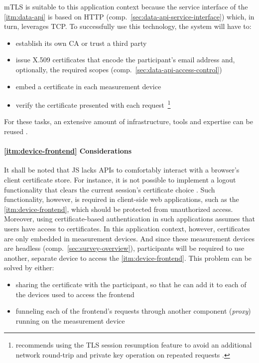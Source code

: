 \acs{mTLS} is suitable to this application context because the service interface of the \ref{itm:data-api} is based on \acs{HTTP} (comp.~\autoref{sec:data-api-service-interface}) which, in turn, leverages \acs{TCP}. To successfully use this technology, the system will have to:

\begin{itemize}
  \item establish its own \acs{CA} or trust a third party
  \item issue X.509 certificates that encode the participant's email address and, optionally, the required scopes (comp.~\autoref{sec:data-api-access-control})
  \item embed a certificate in each measurement device
  \item verify the certificate presented with each request~\footnote{\citeauthor{parsovs2013practical} recommends using the \acs{TLS} session resumption feature to avoid an additional network round-trip and private key operation on repeated requests \cite[p.~3]{parsovs2013practical}.}
\end{itemize}

For these tasks, an extensive amount of infrastructure, tools and expertise can be reused \cite[p.~37]{hummen2013towards}.


\paragraph{\ref{itm:device-frontend} Considerations}
It shall be noted that \acl{JS} lacks \acsp{API} to comfortably interact with a browser's client certificate store. For instance, it is not possible to implement a logout functionality that clears the current session's certificate choice \cite[p.~8]{parsovs2013practical}. Such functionality, however, is required in client-side web applications, such as the \ref{itm:device-frontend}, which should be protected from unauthorized access. Moreover, using certificate-based authentication in such applications assumes that users have access to certificates. In this application context, however, certificates are only embedded in measurement devices. And since these measurement devices are headless (comp.~\autoref{sec:survey-overview}), participants will be required to use another, separate device to access the \ref{itm:device-frontend}. This problem can be solved by either:

\begin{itemize}
  \item sharing the certificate with the participant, so that he can add it to each of the devices used to access the frontend
  \item funneling each of the frontend's requests through another component (\textit{proxy}) running on the measurement device
\end{itemize}

